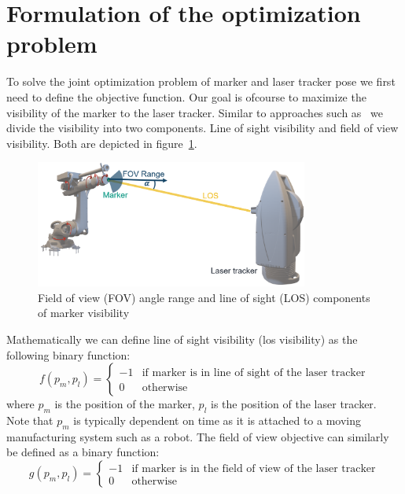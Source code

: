 \documentclass{svproc}
\begin{document}
\section{Formulation of the optimization problem}
To solve the joint optimization problem of marker and laser tracker pose we first need to define the objective function.
Our goal is ofcourse to maximize the visibility of the marker to the laser tracker.
Similar to approaches such as~\cite{ieee_sensors} we divide the visibility into two components.
Line of sight visibility and field of view visibility.
Both  are depicted in figure~\ref{fig:visibility}.
\begin{figure}
        \centering
        \includegraphics[width=0.8\textwidth]{figures/visibility.png}
        \caption{Field of view (FOV) angle range and line of sight (LOS) components of marker visibility}
        \label{fig:visibility}
\end{figure}
Mathematically we can define line of sight visibility (los visibility) as the following binary function:
\begin{equation}
    f(p_m,p_l) = \begin{cases}
    -1 & \text{if } \text{marker is in line of sight of the laser tracker} \\
    0 & \text{otherwise}
    \end{cases}
\end{equation}
where $p_m$ is the position of the marker, $p_l$ is the position of the laser tracker.
Note that $p_m$ is typically dependent on time as it is attached to a moving manufacturing system such as a robot.
The field of view objective can similarly be defined as a binary function:
\begin{equation}
    g(p_m,p_l) = \begin{cases}
    -1 & \text{if } \text{marker is in the field of view of the laser tracker} \\
    0 & \text{otherwise}
    \end{cases}
\end{equation}
\end{document}

